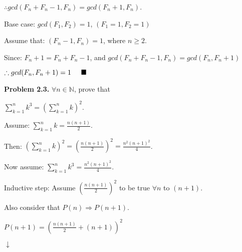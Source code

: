 \documentclass{article}
\begin{document}
\vspace{0.2cm}

$\therefore gcd(F_n + F_n-1, F_n) = gcd(F_n+1, F_n)$.

\vspace{0.2cm}

Base case: $gcd(F_1, F_2) = 1$, \hspace{0.2cm} $(F_1 = 1, F_2 = 1)$

\vspace{0.2cm}

Assume that: $(F_n-1, F_n) = 1$, \hspace{0.2cm} where $n \geq 2$.

\vspace{0.2cm}

Since: $F_n+1 = F_n + F_n-1$, and $gcd(F_n + F_n-1, F_n) = gcd(F_n, F_n+1)$

\vspace{0.2cm}

$\therefore gcd(F_n, F_n+1) = 1 \hspace{0.5cm} \blacksquare$

\vspace{0.5cm}

\textbf{Problem 2.3.} $\forall n \in \mathbb{N}$, prove that

\begin{center}
	$\displaystyle\sum_{k=1}^{n} k^3 = \left(\displaystyle\sum_{k=1}^{n} k\right)^2$.
\end{center}

Assume: $\displaystyle\sum_{k=1}^{n} k = \frac{n(n+1)}{2}$.

Then: 	$\left(\displaystyle\sum_{k=1}^{n} k \right)^2 =  \left(\frac{n(n+1)}{2}\right)^2 = \frac{n^2(n+1)^2}{4}$.

Now assume: $\displaystyle\sum_{k=1}^{n} k^3 = \frac{n^2(n+1)^2}{4}$.

Inductive step: Assume $\left(\frac{n(n+1)}{2}\right)^2$ to be true $\forall n$ to $(n+1)$. 

\vspace{0.2cm}

Also consider that $P(n) \Rightarrow P(n+1)$.

\vspace{0.5cm}

$P(n+1) = \left(\frac{n(n+1)}{2} + (n+1) \right)^2$

\vspace{0.2cm}
\hspace{2cm} $\downarrow$
\vspace{0.2cm}
\end{document}

